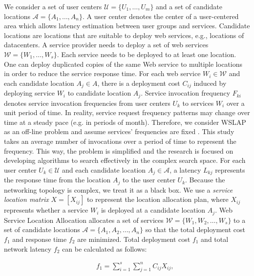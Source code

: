 \documentclass[10pt,journal,compsoc]{IEEEtran}
\begin{document}
We consider a set of user centers $\mathcal{U }= \{U_1, \dots, U_m \}$ and a set of candidate locations $\mathcal{A} = \{A_1, \dots, A_n\}$. A user center denotes the center of a user-centered area which allows latency estimation between user groups and services. Candidate locations are locations that are suitable to deploy web services, e.g., locations of datacenters. A service provider needs to deploy a set of web services $\mathcal{W} = \{W_1, \dots, W_s\}$. Each service needs to be deployed to at least one location. One can deploy duplicated copies of the same Web service to multiple locations in order to reduce the service response time. For each web service $W_i \in \mathcal{W}$ and each candidate location $A_j \in A$, there is a deployment cost $C_{ij}$ induced by deploying service $W_i$ to candidate location $A_j$. Service invocation frequency $F_{ki}$ denotes service invocation frequencies from user centers $U_k$ to services $W_i$ over a unit period of time. In reality, service request frequency patterns may change over time at a steady pace (e.g. in periods of month). Therefore, we consider WSLAP as an off-line problem and assume services' frequencies are fixed \cite{Energy_9}. This study takes an average number of invocations over a period of time to represent the frequency. This way, the problem is simplified and the research is focused on developing algorithms to search effectively in the complex search space. For each user center $U_k \in \mathcal{U}$ and each candidate location $A_j \in \mathcal{A}$, a latency $L_{kj}$ represents the response time from the location $A_j$ to the user center $U_k$. Because the networking topology is complex, we treat it as a black box.
We use a \emph{service location matrix} $X = [X_{ij}]$ to represent the location allocation plan, where $X_{ij}$ represents whether a service $W_i$ is deployed at a candidate location $A_j$. Web Service Location Allocation allocates a set of services $\mathcal{W} = \{ W_1, W_2, \dots,  W_s\}$  to a set of candidate locations $\mathcal{A}= \{ A_1, A_2, \dots,  A_n \}$ so that the total deployment cost $f_1$ and response time $f_2$ are minimized. Total deployment cost $f_1$ and total network latency $f_2$ can be calculated as follows:

\begin{equation} \label{eq:fit-cost}
\begin{aligned}
& & &  f_1 = \sum\limits_{i=1}^s \sum\limits_{j = 1}^n C_{ij} X_{ij},
\end{aligned}
\end{equation}
\end{document}
